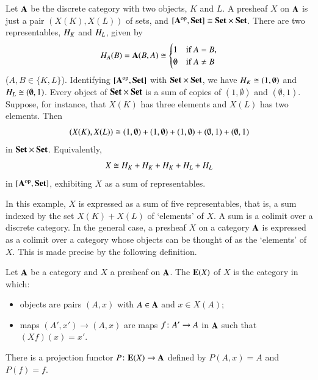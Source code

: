 \begin{example}
\label{eg:discrete-dense}
Let $\mathbf{A}$ be the discrete category with two objects, $K$ and $L$.  A
presheaf $X$ on $\mathbf{A}$ is just a pair $(X(K), X(L))$ of sets, and
$[\mathbf{A}^{\mathrm{op}},\mathbf{Set}] \cong \mathbf{Set} \times \mathbf{Set}$.  There are two representables,
$H_K$ and $H_L$, given by
\[
H_A(B)
=
\mathbf{A}(B, A)
\cong
\begin{cases}
1               &\text{if } A = B,    \\
\emptyset       &\text{if } A \neq B
\end{cases}
\]
($A, B \in \{ K, L \}$).  Identifying $[\mathbf{A}^{\mathrm{op}},\mathbf{Set}]$ with $\mathbf{Set} \times
\mathbf{Set}$, we have $H_K \cong (1, \emptyset)$ and $H_L \cong (\emptyset, 1)$.
Every object of $\mathbf{Set} \times \mathbf{Set}$ is a sum of copies of $(1, \emptyset)$
and $(\emptyset, 1)$.  Suppose, for instance, that $X(K)$ has three elements
and $X(L)$ has two elements.  Then
\[
(X(K), X(L))
\cong
(1, \emptyset) + (1, \emptyset) + (1, \emptyset) +
(\emptyset, 1) + (\emptyset, 1)
\]
in $\mathbf{Set} \times \mathbf{Set}$.  Equivalently,
\[
X
\cong
H_K + H_K + H_K + H_L + H_L
\]
in $[\mathbf{A}^{\mathrm{op}},\mathbf{Set}]$, exhibiting $X$ as a sum of representables.
\end{example}

In this example, $X$ is expressed as a sum of five representables, that is,
a sum indexed by the set $X(K) + X(L)$ of `elements' of $X$.  A sum is a
colimit over a discrete category.  In the general case, a presheaf $X$ on a
category $\mathbf{A}$ is expressed as a colimit over a category whose objects
can be thought of as the `elements' of $X$.  This is made precise by the
following definition.

\begin{defn}
\label{defn:cat-elts}
Let $\mathbf{A}$ be a category and $X$ a presheaf on $\mathbf{A}$.  The
 $\mathbf{E}(X)$%
%
%
of $X$ is the category in which:
%
\begin{itemize}
\item
objects are pairs $(A, x)$ with $A \in \mathbf{A}$ and $x \in X(A)$;

\item
maps $(A', x') \to (A, x)$ are maps $f\from A' \to A$ in $\mathbf{A}$ such
that $(Xf)(x) = x'$.
\end{itemize}
\end{defn}
%
There is a projection functor $P\from \elt{X} \to \scat{A}$ defined by $P(A, x)
= A$ and $P(f) = f$.

